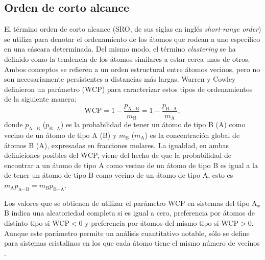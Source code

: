 \subsection{Orden de corto alcance}

El término orden de corto alcance (SRO, de sus siglas en inglés 
\textit{short-range order}) se utiliza para denotar el ordenamiento de los átomos
que rodean a uno específico en una cáscara determinada. Del mismo modo, el término 
\textit{clustering} se ha definido como la tendencia de los átomos similares a 
estar cerca unos de otros. Ambos conceptos se refieren a un orden estructural 
entre átomos vecinos, pero no son necesariamente persistentes a distancias más 
largas. Warren \cite{warren69} y Cowley \cite{cowley1950} definieron un 
parámetro (WCP) para caracterizar estos tipos de ordenamientos de la siguiente 
manera:
\begin{equation}
    \text{WCP} = 1 - \frac{p_{\text{A}-\text{B}}}{m_\text{B}} = 1 - \frac{p_{\text{B}-\text{A}}}{m_\text{A}},
\end{equation}
donde $p_{\text{A}-\text{B}}$ ($p_{\text{B}-\text{A}}$) es la probabilidad de tener un átomo de tipo B (A) como
vecino de un átomo de tipo A (B) y $m_\text{B}$ ($m_\text{A}$) es la concentración global de átomos
B (A), expresadas en fracciones molares. La igualdad, en ambas definiciones 
posibles del WCP, viene del hecho de que la probabilidad de encontrar a un átomo 
de tipo A como vecino de un átomo de tipo B es igual a la de tener un átomo de 
tipo B como vecino de un átomo de tipo A, esto es $m_\text{A} p_{\text{A}-\text{B}} = m_\text{B} p_{\text{B}-\text{A}}$.

Los valores que se obtienen de utilizar el parámetro WCP en sistemas del tipo
A$_x$B indica una aleatoriedad completa si es igual a cero, preferencia por 
átomos de distinto tipo si WCP$ < 0$ y preferencia por átomos del mismo tipo si 
WCP$ > 0$. Aunque este parámetro permite un análisis cuantitativo notable, sólo
se define para sistemas cristalinos en los que cada átomo tiene el mismo número
de vecinos \cite{warren69}.

